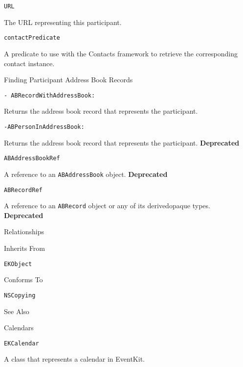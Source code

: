 \documentclass{article}
\begin{document}
\texttt{URL}

The URL representing this participant.

\texttt{contactPredicate}

A predicate to use with the Contacts framework to retrieve the corresponding contact instance.

Finding Participant Address Book Records

\texttt{- ABRecordWithAddressBook:}

Returns the address book record that represents the participant.

\texttt{-ABPersonInAddressBook:}

Returns the address book record that represents the participant.
\newline
\textbf{Deprecated}

\texttt{ABAddressBookRef}

A reference to an \texttt{ABAddressBook} object.
\newline
\textbf{Deprecated}

\texttt{ABRecordRef}

A reference to an \texttt{ABRecord} object or any of its derivedopaque types.
\newline
\textbf{Deprecated}

Relationships

Inherits From

\texttt{EKObject}

Conforms To

\texttt{NSCopying}

See Also

Calendars

\texttt{EKCalendar}

A class that represents a calendar in EventKit.

\newpage
\end{document}
